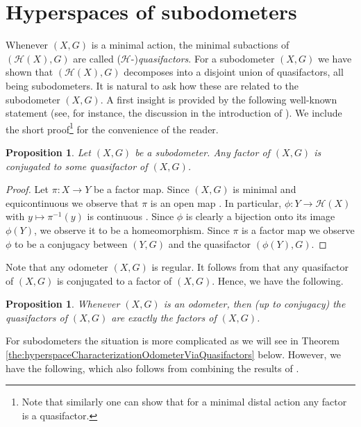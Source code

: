 \documentclass[12pt, reqno]{amsart}
\newtheorem{proposition}[theorem]{Proposition}
\theoremstyle{definition}
\theoremstyle{remark}
\numberwithin{equation}{section}
\theoremstyle{theorem}
\theoremstyle{remark}
\def\hyper{{\mathcal{H}}}
\begin{document}
\section{Hyperspaces of subodometers}
\label{sec:hyperspacesOfSubodometers}
Whenever $(X,G)$ is a minimal action, the minimal subactions of $(\hyper(X),G)$ are called ($\hyper$-)\emph{quasifactors}. 
For a subodometer $(X,G)$ we have shown that $(\hyper(X),G)$ decomposes into a disjoint union of quasifactors, all being subodometers. 
It is natural to ask how these are related to the subodometer $(X,G)$. 
A first insight is provided by the following well-known statement (see, for instance, the discussion in the introduction of \cite{glasner1995quasifactors}). We include the short proof\footnote{
    Note that similarly one can show that for a minimal distal action any factor is a quasifactor. 
}
for the convenience of the reader.

\begin{proposition}
\label{pro:hyperspacefactorsAsQuasifactors}
    Let $(X,G)$ be a subodometer. 
    Any factor of $(X,G)$ is conjugated to some quasifactor of $(X,G)$. 
\end{proposition}
\begin{proof}
    Let $\pi\colon X\to Y$ be a factor map. 
    Since $(X,G)$ is minimal and equicontinuous we observe that $\pi$ is an open map \cite[Theorem~7.3]{auslander1988minimal}. 
    In particular, $\phi\colon Y\to \hyper(X)$ with $y\mapsto \pi^{-1}(y)$ is continuous \cite[Appendix A.7]{deVries1993elements}.
    Since $\phi$ is clearly a bijection onto its image $\phi(Y)$, we observe it to be a homeomorphism. 
    Since $\pi$ is a factor map we observe $\phi$ to be a conjugacy between $(Y,G)$ and the quasifactor $(\phi(Y),G)$. 
\end{proof}

Note that any odometer $(X,G)$ is regular. 
It follows from \cite[Corollary~11.21]{auslander1988minimal} that any quasifactor of $(X,G)$ is conjugated to a factor of $(X,G)$. 
Hence, we have the following. 

\begin{proposition}
\label{pro:hyperspaceOdometersQFareExactlyF}
    Whenever $(X,G)$ is an odometer, then (up to conjugacy) the quasifactors of $(X,G)$ are exactly the factors of $(X,G)$. 
\end{proposition}

For subodometers the situation is more complicated as we will see in Theorem \ref{the:hyperspaceCharacterizationOdometerViaQuasifactors} below. 
However, we have the following, which also follows from combining the results of \cite{glasner1975compressibility,cortez2026minimal}. 
\end{document}
